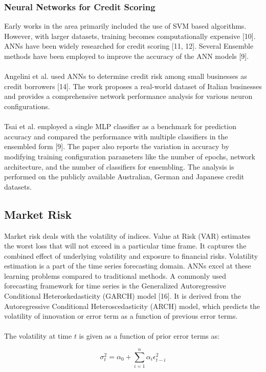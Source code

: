 \documentclass[a4paper, 12pt]{article}
\begin{document}
\subsubsection{Neural Networks for Credit Scoring}
\noindent Early works in the area primarily included the use of SVM based algorithms. However, with larger datasets, training becomes computationally expensive [10]. ANNs have been widely researched for credit scoring [11, 12]. Several Ensemble methods have been employed to improve the accuracy of the ANN models [9].
\\
\\
Angelini et al. used ANNs to determine credit risk among small businesses as credit borrowers [14]. The work proposes a real-world dataset of Italian businesses and provides a comprehensive network performance analysis for various neuron configurations.
\\
\\
Tsai et al. employed a single MLP classifier as a benchmark for prediction accuracy and compared the performance with multiple classifiers in the ensembled form [9]. The paper also reports the variation in accuracy by modifying training configuration parameters like the number of epochs, network architecture, and the number of classifiers for ensembling. The analysis is performed on the publicly available Australian, German and Japanese credit datasets.


\vskip 0.2in
\subsection{Market Risk}
\noindent Market risk deals with the volatility of indices. Value at Risk (VAR) estimates the worst loss that will not exceed in a particular time frame. It captures the combined effect of underlying volatility and exposure to financial risks. Volatility estimation is a part of the time series forecasting domain. ANNs excel at these learning problems compared to traditional methods. A commonly used forecasting framework for time series is the Generalized Autoregressive Conditional Heteroskedasticity (GARCH) model [16]. It is derived from the Autoregressive Conditional Heteroscedasticity (ARCH) model, which predicts the volatility of innovation or error term as a function of previous error terms.
\\
\\
The volatility at time \(t\) is given as a function of prior error terms as:

\begin{equation}
    \sigma_t^2 = \alpha_0 + \sum_{i = 1}^{n} \alpha_i \epsilon_{t - i}^2
\end{equation}
\end{document}
